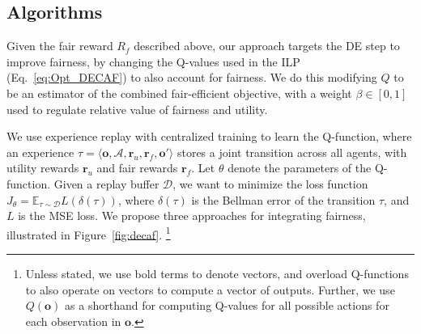 \subsection{Algorithms}


Given the fair reward $R_f$ described above, our approach targets the DE step to improve fairness, by changing the Q-values used in the ILP (Eq.~\ref{eq:Opt_DECAF}) to also account for fairness. We do this modifying $Q$ to be an estimator of the combined fair-efficient objective, with a weight $\beta\in [0,1]$ used to regulate relative value of fairness and utility. 

We use experience replay with centralized training to learn the Q-function, where an experience $\tau=\langle \mathbf{o},\mathcal{A},\mathbf{r}_u,\mathbf{r}_f,\mathbf{o}'\rangle$ stores a joint transition across all agents, with utility rewards $\mathbf{r}_u$ and fair rewards $\mathbf{r}_f$. Let $\theta$ denote the parameters of the Q-function. Given a replay buffer $\mathcal{D}$, we want to minimize the loss function $J_\theta=\mathbb{E}_{\tau\sim \mathcal{D}}L(\delta(\tau))$, where $\delta(\tau)$ is the Bellman error of the transition $\tau$, and $L$ is the MSE loss.
We propose three approaches for integrating fairness, illustrated in Figure~\ref{fig:decaf}. \footnote{Unless stated, we use bold terms to denote vectors, and overload Q-functions to also operate on vectors to compute a vector of outputs. Further, we use $Q(\mathbf{o})$ as a shorthand for computing Q-values for all possible actions for each observation in $\mathbf{o}$.}

